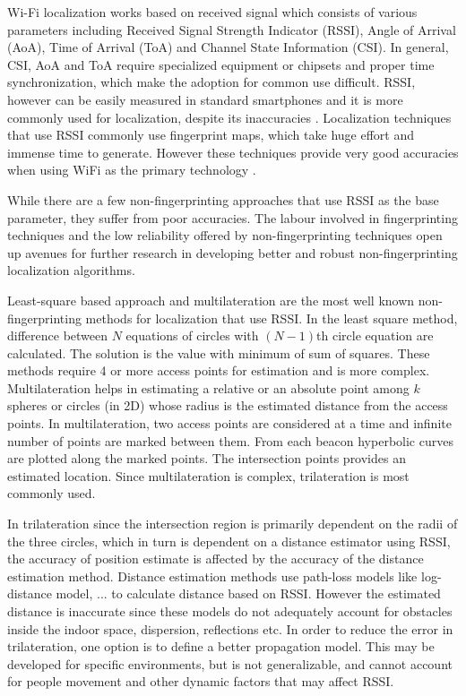 \documentclass[twocolumn, 11pt]{IEEEtran}
\begin{document}
Wi-Fi localization works based on received signal which consists of various parameters including Received Signal Strength Indicator (RSSI), Angle of Arrival (AoA), Time of Arrival (ToA) and Channel State Information (CSI). In general, CSI, AoA and ToA require specialized equipment or chipsets and proper time synchronization, which make the adoption for common use difficult. RSSI, however can be easily measured in standard smartphones and it is more commonly used for localization, despite its inaccuracies \cite{RSSI Analysis}. Localization techniques that use RSSI commonly use fingerprint maps, which take huge effort and immense time to generate. However these techniques provide very good accuracies when using WiFi as the primary technology \cite{microsoft competition}.

While there are a few non-fingerprinting approaches that use RSSI as the base parameter, they suffer from poor accuracies. The labour involved in fingerprinting techniques and the low reliability offered by non-fingerprinting techniques open up avenues for further research in developing better and robust non-fingerprinting localization algorithms.

Least-square based approach and multilateration \cite{Least Square and Multilateration} are the most well known non-fingerprinting methods for localization that use RSSI. In the least square  method, difference between $N$ equations of circles with $(N-1)$th circle equation are calculated. The solution is the value with minimum of sum of squares. These methods require 4 or more access points for estimation and is more complex. Multilateration helps in estimating a relative or an absolute point among $k$ spheres or circles (in 2D) whose radius is the estimated distance from the access points. In multilateration, two access points are considered at a time and infinite number of points are marked between them. From each beacon hyperbolic curves are plotted along the marked points. The intersection points provides an estimated location. Since multilateration is complex, trilateration is most commonly used. 

In trilateration since the intersection region is primarily dependent on the radii of the three circles, which in turn is dependent on a distance estimator using  RSSI, the accuracy of position estimate is affected by the accuracy of the distance estimation method. Distance estimation methods use path-loss models like log-distance model, ... to calculate distance based on RSSI. However the estimated distance is inaccurate since these models do not adequately account for obstacles inside the indoor space, dispersion, reflections etc. In order to reduce the error in trilateration, one option is to define a better propagation model. This may be developed for specific environments, but is not generalizable, and cannot account for people movement and other dynamic factors that may affect RSSI.
\end{document}
